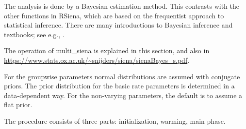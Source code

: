 \documentclass[a4paper,fleqn,11pt]{article}
\newcommand{\+}{\, + \,}
\newcommand{\rs}{{\sf RSiena}}
\begin{document}
  The analysis is done by a Bayesian estimation method.
  This contrasts with the other functions in \rs, which are based on the
  frequentist approach to statistical inference.
  There are many introductions to Bayesian inference and textbooks; see e.g.,
  \citet{KaplanDepaoli2013,Gill2015,DonovanMickey2019}.
  \medskip

  The operation of \textsf{multi\_siena} is explained in this section,
  and also in \url{https://www.stats.ox.ac.uk/~snijders/siena/sienaBayes_s.pdf}.

  For the groupwise parameters normal distributions are assumed with conjugate
  priors. The prior distribution for the basic rate parameters is determined
  in a data-dependent way. For the non-varying parameters,
  the default is to assume a flat prior.

  The procedure consists of three parts: initialization, warming,
  main phase.
\end{document}
